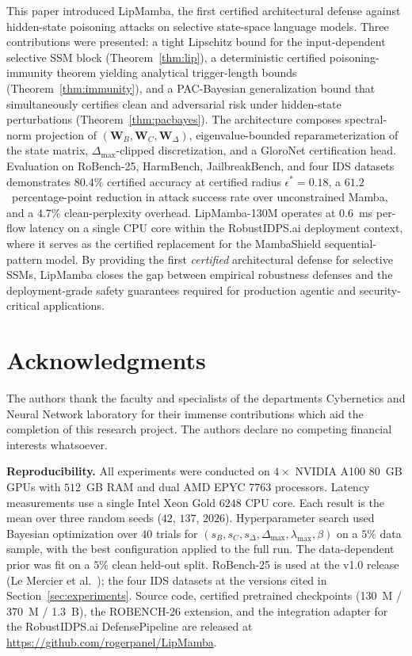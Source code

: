 \documentclass[12pt,a4paper]{article}
\theoremstyle{definition}
\theoremstyle{remark}
\newcommand{\modelname}{LipMamba}
\newcommand{\benchname}{ROBENCH-26}
\begin{document}
This paper introduced \modelname{}, the first certified architectural defense against hidden-state poisoning attacks on selective state-space language models. Three contributions were presented: a tight Lipschitz bound for the input-dependent selective SSM block (Theorem~\ref{thm:lip}), a deterministic certified poisoning-immunity theorem yielding analytical trigger-length bounds (Theorem~\ref{thm:immunity}), and a PAC-Bayesian generalization bound that simultaneously certifies clean and adversarial risk under hidden-state perturbations (Theorem~\ref{thm:pacbayes}). The architecture composes spectral-norm projection of $(\mathbf{W}_B, \mathbf{W}_C, \mathbf{W}_\Delta)$, eigenvalue-bounded reparameterization of the state matrix, $\Delta_{\max}$-clipped discretization, and a GloroNet certification head. Evaluation on RoBench-25, HarmBench, JailbreakBench, and four IDS datasets demonstrates $80.4\%$ certified accuracy at certified radius $\epsilon^* = 0.18$, a $61.2$~percentage-point reduction in attack success rate over unconstrained Mamba, and a $4.7\%$ clean-perplexity overhead. \modelname{}-130M operates at $0.6$~ms per-flow latency on a single CPU core within the RobustIDPS.ai deployment context, where it serves as the certified replacement for the MambaShield sequential-pattern model. By providing the first \emph{certified} architectural defense for selective SSMs, \modelname{} closes the gap between empirical robustness defenses and the deployment-grade safety guarantees required for production agentic and security-critical applications.


\section*{Acknowledgments}

The authors thank the faculty and specialists of the departments Cybernetics and Neural Network laboratory for their immense contributions which aid the completion of this research project.  The authors declare no competing financial interests whatsoever.

\noindent\textbf{Reproducibility.} All experiments were conducted on $4 \times$ NVIDIA A100 80~GB GPUs with $512$~GB RAM and dual AMD EPYC 7763 processors. Latency measurements use a single Intel Xeon Gold $6248$ CPU core. Each result is the mean over three random seeds ($42$, $137$, $2026$). Hyperparameter search used Bayesian optimization over $40$ trials for $(s_B, s_C, s_\Delta, \Delta_{\max}, \lambda_{\max}, \beta)$ on a $5\%$ data sample, with the best configuration applied to the full run. The data-dependent prior was fit on a $5\%$ clean held-out split. RoBench-25 is used at the v1.0 release (Le Mercier et al.~\cite{lemercier2026hispa}); the four IDS datasets at the versions cited in Section~\ref{sec:experiments}. Source code, certified pretrained checkpoints (130~M / 370~M / 1.3~B), the \benchname{} extension, and the integration adapter for the RobustIDPS.ai DefensePipeline are released at \url{https://github.com/rogerpanel/LipMamba}.
\end{document}
